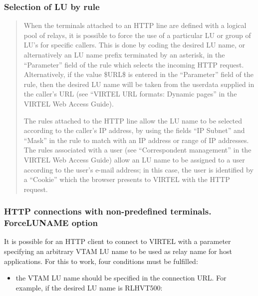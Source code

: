 \documentclass[letterpaper,10pt,english]{sphinxmanual}
\begin{document}
\subsubsection{Selection of LU by rule}
\label{\detokenize{connectivity_guide:selection-of-lu-by-rule}}\begin{quote}

When the terminals attached to an HTTP line are defined with a logical pool of relays, it is possible to force the use of a particular LU or group of LU’s for specific callers. This is done by coding the desired LU name, or alternatively an LU name prefix terminated by an asterisk, in the “Parameter” field of the rule which selects the incoming HTTP request. Alternatively, if the value \$URL\$ is entered in the “Parameter” field of the rule, then the desired LU name will be taken from the userdata supplied in the caller’s URL (see “VIRTEL URL formats: Dynamic pages” in the VIRTEL Web Access Guide).

The rules attached to the HTTP line allow the LU name to be selected according to the caller’s IP address, by using the fields “IP Subnet” and “Mask” in the rule to match with an IP address or range of IP addresses. The rules associated with a user (see “Correspondent management” in the VIRTEL Web Access Guide) allow an LU name to be assigned to a user according to the user’s e-mail address; in this case, the user is identified by a “Cookie” which the browser presents to VIRTEL with the HTTP request.
\end{quote}


\subsubsection{HTTP connections with non-predefined terminals. ForceLUNAME option}
\label{\detokenize{connectivity_guide:http-connections-with-non-predefined-terminals-forceluname-option}}\label{\detokenize{connectivity_guide:v457cn-forceluname}}
It is possible for an HTTP client to connect to VIRTEL with a parameter specifying an arbitrary VTAM LU name to be used as relay name for host applications. For this to work, four conditions must be fulfilled:
\begin{itemize}
\item {} 
the VTAM LU name should be specified in the connection URL. For
example, if the desired LU name is RLHVT500:

\end{itemize}
\end{document}
